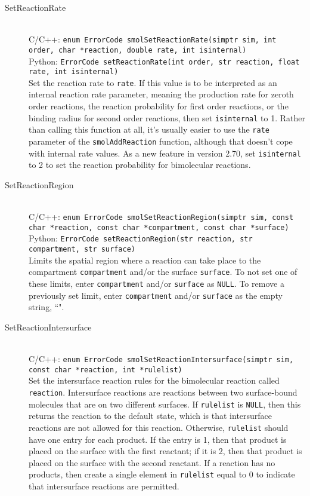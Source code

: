 \documentclass {scrbook}
\newcommand {\ttt} {\texttt}
\begin{document}
\begin{description}
\item[SetReactionRate]
\hfill \\
C/C++: \ttt{enum ErrorCode smolSetReactionRate(simptr sim, int order, char *reaction, double rate, int isinternal)}\\
Python: \ttt{ErrorCode setReactionRate(int order, str reaction, float rate, int isinternal)}\\
Set the reaction rate to \ttt{rate}. If this value is to be interpreted as an internal reaction rate parameter, meaning the production rate for zeroth order reactions, the reaction probability for first order reactions, or the binding radius for second order reactions, then set \ttt{isinternal} to 1. Rather than calling this function at all, it's usually easier to use the \ttt{rate} parameter of the \ttt{smolAddReaction} function, although that doesn't cope with internal rate values. As a new feature in version 2.70, set \ttt{isinternal} to 2 to set the reaction probability for bimolecular reactions.

\item[SetReactionRegion]
\hfill \\
C/C++: \ttt{enum ErrorCode smolSetReactionRegion(simptr sim, const char *reaction, const char *compartment, const char *surface)}\\
Python: \ttt{ErrorCode setReactionRegion(str reaction, str compartment, str surface)}\\
Limits the spatial region where a reaction can take place to the compartment \ttt{compartment} and/or the surface \ttt{surface}. To not set one of these limits, enter \ttt{compartment} and/or \ttt{surface} as \ttt{NULL}. To remove a previously set limit, enter \ttt{compartment} and/or \ttt{surface} as the empty string, ``".

\item[SetReactionIntersurface]
\hfill \\
C/C++: \ttt{enum ErrorCode smolSetReactionIntersurface(simptr sim, const char *reaction, int *rulelist)}\\
Set the intersurface reaction rules for the bimolecular reaction called \ttt{reaction}. Intersurface reactions are reactions between two surface-bound molecules that are on two different surfaces. If \ttt{rulelist} is \ttt{NULL}, then this returns the reaction to the default state, which is that intersurface reactions are not allowed for this reaction. Otherwise, \ttt{rulelist} should have one entry for each product. If the entry is 1, then that product is placed on the surface with the first reactant; if it is 2, then that product is placed on the surface with the second reactant. If a reaction has no products, then create a single element in \ttt{rulelist} equal to 0 to indicate that intersurface reactions are permitted.


\end{description}
\end{document}
